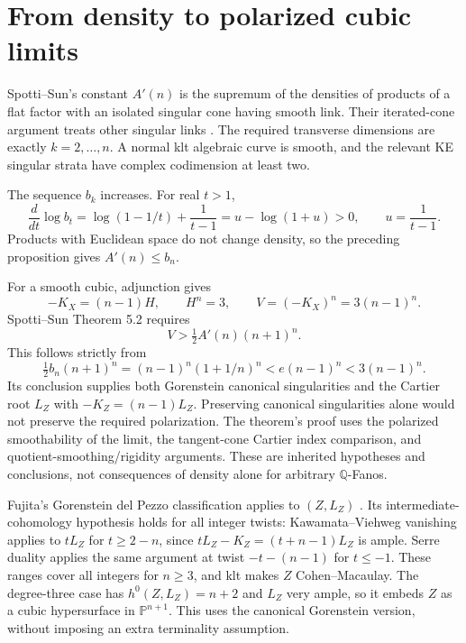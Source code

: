 \documentclass[11pt]{article}
\newcommand{\Q}{\mathbb Q}
\newcommand{\PP}{\mathbb P}
\begin{document}
\section{From density to polarized cubic limits}
Spotti--Sun's constant $A'(n)$ is the supremum of the densities of
products of a flat factor with an isolated singular cone having smooth
link. Their iterated-cone argument treats other singular links
\cite[Lemma 5.3 and Theorem 5.2]{SS}. The required transverse dimensions
are exactly $k=2,\ldots,n$. A normal klt algebraic curve is smooth, and
the relevant KE singular strata have complex codimension at least two.

The sequence $b_k$ increases. For real $t>1$,
\[
 \frac{d}{dt}\log b_t
 =\log(1-1/t)+\frac1{t-1}
 =u-\log(1+u)>0,\qquad u=\frac1{t-1}.
\]
Products with Euclidean space do not change density, so the preceding
proposition gives $A'(n)\leq b_n$.

For a smooth cubic, adjunction gives
\[
 -K_X=(n-1)H,\qquad H^n=3,\qquad V=(-K_X)^n=3(n-1)^n.
\]
Spotti--Sun Theorem 5.2 requires
\[
 V>\tfrac12 A'(n)(n+1)^n.
\]
This follows strictly from
\[
 \tfrac12 b_n(n+1)^n
 =(n-1)^n(1+1/n)^n<e(n-1)^n<3(n-1)^n.
\]
Its conclusion supplies both Gorenstein canonical singularities and the
Cartier root $L_Z$ with $-K_Z=(n-1)L_Z$. Preserving canonical singularities
alone would not preserve the required polarization. The theorem's proof
uses the polarized smoothability of the limit, the tangent-cone Cartier
index comparison, and quotient-smoothing/rigidity arguments. These are
inherited hypotheses and conclusions, not consequences of density alone
for arbitrary $\Q$-Fanos.

Fujita's Gorenstein del Pezzo classification applies to $(Z,L_Z)$
\cite{Fujita}. Its intermediate-cohomology hypothesis holds for all
integer twists: Kawamata--Viehweg vanishing applies to $tL_Z$ for
$t\geq2-n$, since $tL_Z-K_Z=(t+n-1)L_Z$ is ample. Serre duality applies
the same argument at twist $-t-(n-1)$ for $t\leq-1$. These ranges cover
all integers for $n\geq3$, and klt makes $Z$ Cohen--Macaulay.
The degree-three case has $h^0(Z,L_Z)=n+2$ and $L_Z$ very ample, so it
embeds $Z$ as a cubic hypersurface in $\PP^{n+1}$. This uses the canonical
Gorenstein version, without imposing an extra terminality assumption.
\end{document}
